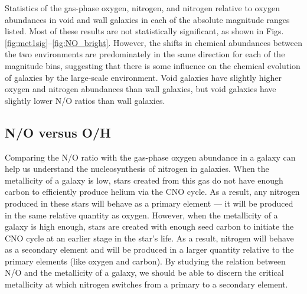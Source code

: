 \begin{table}
    \caption[Abundance statistics]{Statistics of the gas-phase oxygen, nitrogen, 
    and nitrogen relative to oxygen abundances in void and wall galaxies in each 
    of the absolute magnitude ranges listed.  Most of these results are not 
    statistically significant, as shown in Figs. 
    \ref{fig:met1sig}--\ref{fig:NO_bright}.  However, the shifts in chemical 
    abundances between the two environments are predominately in the same 
    direction for each of the magnitude bins, suggesting that there is some 
    influence on the chemical evolution of galaxies by the large-scale 
    environment.   Void galaxies have slightly higher oxygen and nitrogen 
    abundances than wall galaxies, but void galaxies have slightly lower N/O 
    ratios than wall galaxies.}
	    
	\label{tab:stats_P2}
	
\end{table}


\subsection{N/O versus O/H}

Comparing the N/O ratio with the gas-phase oxygen abundance in a galaxy can help 
us understand the nucleosynthesis of nitrogen in galaxies.  When the metallicity 
of a galaxy is low, stars created from this gas do not have enough carbon to 
efficiently produce helium via the CNO cycle.  As a result, any nitrogen 
produced in these stars will behave as a primary element --- it will be produced 
in the same relative quantity as oxygen.  However, when the metallicity of a 
galaxy is high enough, stars are created with enough seed carbon to initiate the 
CNO cycle at an earlier stage in the star's life.  As a result, nitrogen will 
behave as a secondary element and will be produced in a larger quantity relative 
to the primary elements (like oxygen and carbon).  By studying the relation 
between N/O and the metallicity of a galaxy, we should be able to discern the 
critical metallicity at which nitrogen switches from a primary to a secondary 
element.

